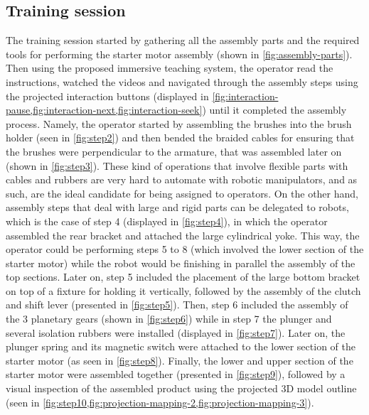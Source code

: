 \subsection{Training session}

The training session started by gathering all the assembly parts and the required tools for performing the starter motor assembly (shown in \cref{fig:assembly-parts}). Then using the proposed immersive teaching system, the operator read the instructions, watched the videos and navigated through the assembly steps using the projected interaction buttons (displayed in \cref{fig:interaction-pause,fig:interaction-next,fig:interaction-seek}) until it completed the assembly process. Namely, the operator started by assembling the brushes into the brush holder (seen in \cref{fig:step2}) and then bended the braided cables for ensuring that the brushes were perpendicular to the armature, that was assembled later on (shown in \cref{fig:step3}). These kind of operations that involve flexible parts with cables and rubbers are very hard to automate with robotic manipulators, and as such, are the ideal candidate for being assigned to operators. On the other hand, assembly steps that deal with large and rigid parts can be delegated to robots, which is the case of step 4 (displayed in \cref{fig:step4}), in which the operator assembled the rear bracket and attached the large cylindrical yoke. This way, the operator could be performing steps 5 to 8 (which involved the lower section of the starter motor) while the robot would be finishing in parallel the assembly of the top sections. Later on, step 5 included the placement of the large bottom bracket on top of a fixture for holding it vertically, followed by the assembly of the clutch and shift lever (presented in \cref{fig:step5}). Then, step 6 included the assembly of the 3 planetary gears (shown in \cref{fig:step6}) while in step 7 the plunger and several isolation rubbers were installed (displayed in \cref{fig:step7}). Later on, the plunger spring and its magnetic switch were attached to the lower section of the starter motor (as seen in \cref{fig:step8}). Finally, the lower and upper section of the starter motor were assembled together (presented in \cref{fig:step9}), followed by a visual inspection of the assembled product using the projected 3D model outline (seen in \cref{fig:step10,fig:projection-mapping-2,fig:projection-mapping-3}).


